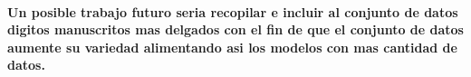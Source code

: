 \documentclass[11pt]{article}
\makeatletter
\newcommand{\boxspacing}{\kern\kvtcb@left@rule\kern\kvtcb@boxsep}
\newcommand{\prompt}[4]{
        {\ttfamily\llap{{\color{#2}[#3]:\hspace{3pt}#4}}\vspace{-\baselineskip}}
    }
\makeatother
\begin{document}
\paragraph{Un posible trabajo futuro seria recopilar e incluir al
conjunto de datos digitos manuscritos mas delgados con el fin de que el
conjunto de datos aumente su variedad alimentando asi los modelos con
mas cantidad de
datos.}\label{un-posible-trabajo-futuro-seria-recopilar-e-incluir-al-conjunto-de-datos-digitos-manuscritos-mas-delgados-con-el-fin-de-que-el-conjunto-de-datos-aumente-su-variedad-alimentando-asi-los-modelos-con-mas-cantidad-de-datos.}

    \begin{tcolorbox}[breakable, size=fbox, boxrule=1pt, pad at break*=1mm,colback=cellbackground, colframe=cellborder]
\prompt{In}{incolor}{ }{\boxspacing}
\begin{Verbatim}[commandchars=\\\{\}]

\end{Verbatim}
\end{tcolorbox}


    
    
    
\end{document}
